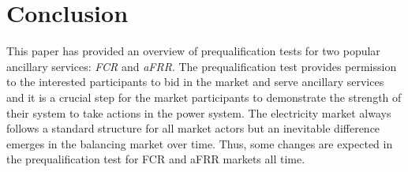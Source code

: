 \chapter{Conclusion}

This paper has provided an overview of prequalification tests for two popular ancillary services: \textit{FCR} and \textit{aFRR}. The prequalification test provides permission to the interested participants to bid in the market and serve ancillary services and it is a crucial step for the market participants to demonstrate the strength of their system to take actions in the power system. The electricity market always follows a standard structure for all market actors but an inevitable difference emerges in the balancing market over time. Thus, some changes are expected in the prequalification test for FCR and aFRR markets all time.
\clearpage
